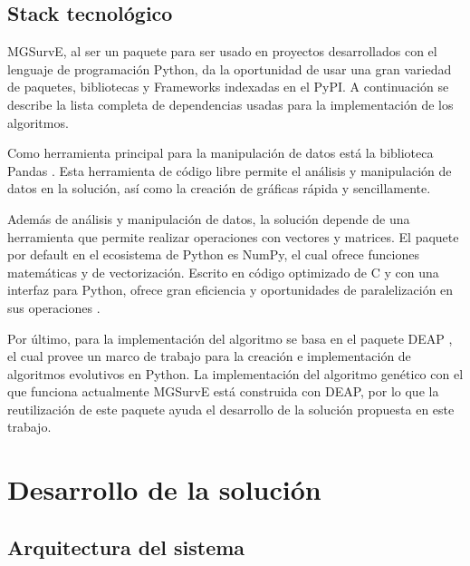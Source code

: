 \documentclass[letterpaper]{report}
\begin{document}
    \subsection{Stack tecnológico}
    MGSurvE, al ser un paquete para ser usado en proyectos desarrollados con el
    lenguaje de programación Python, da la oportunidad de usar una gran variedad
    de paquetes, bibliotecas y Frameworks indexadas en el PyPI. A continuación
    se describe la lista completa de dependencias usadas para la implementación
    de los algoritmos.

    Como herramienta principal para la manipulación de datos está la biblioteca
    Pandas \cite{PandasDocs}. Esta herramienta de código libre permite el
    análisis y manipulación de datos en la solución, así como la creación de
    gráficas rápida y sencillamente.

    Además de análisis y manipulación de datos, la solución depende de una
    herramienta que permite realizar operaciones con vectores y matrices. El
    paquete por default en el ecosistema de Python es NumPy, el cual ofrece
    funciones matemáticas y de vectorización. Escrito en código optimizado de C
    y con una interfaz para Python, ofrece gran eficiencia y oportunidades de 
    paralelización en sus operaciones \cite{NumPyDocs}.

    Por último, para la implementación del algoritmo se basa en el paquete DEAP
    \cite{DEAPDocs}, el cual provee un marco de trabajo para la creación e
    implementación de algoritmos evolutivos en Python. La implementación del
    algoritmo genético con el que funciona actualmente MGSurvE está construida
    con DEAP, por lo que la reutilización de este paquete ayuda el desarrollo de
    la solución propuesta en este trabajo.

  \section{Desarrollo de la solución}
    \subsection{Arquitectura del sistema}
\end{document}
